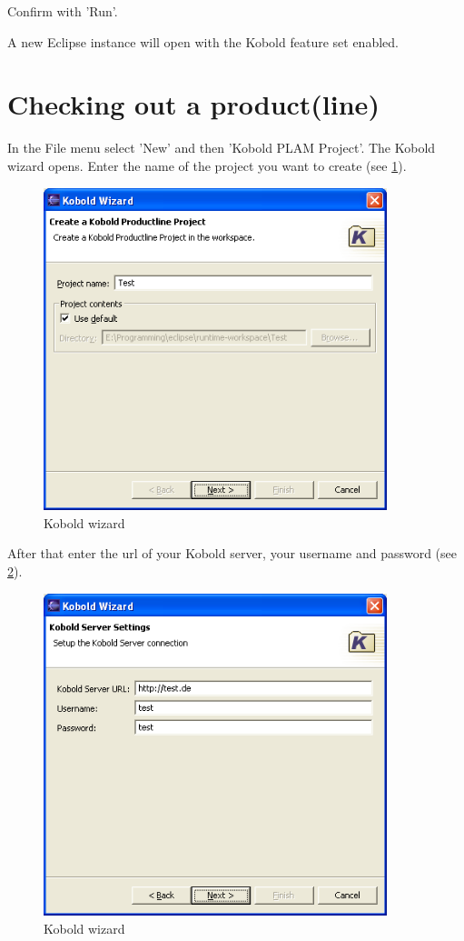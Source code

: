 Confirm with 'Run'.

A new Eclipse instance will open with the Kobold feature set enabled.

\section{Checking out a product(line)}

In the File menu select 'New' and then 'Kobold PLAM Project'. The Kobold wizard opens.
Enter the name of the project you want to create (see \ref{wizard1}).

\begin{figure}[h!]
\begin{center}
\includegraphics[width=10cm]{wizard1.png}
   \caption{Kobold wizard}
\label{wizard1}
\end{center}
\end{figure}\par

After that enter the url of your Kobold server, your username and password (see \ref{wizard2}).

\begin{figure}[h!]
\begin{center}
\includegraphics[width=10cm]{wizard2.png}
   \caption{Kobold wizard}
\label{wizard2}
\end{center}
\end{figure}\par

